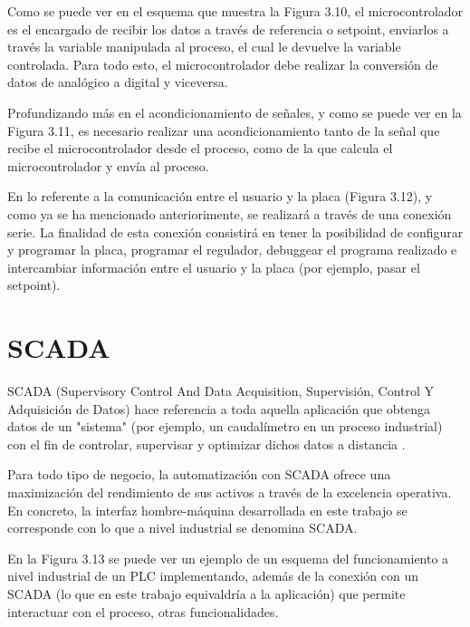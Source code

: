 Como se puede ver en el esquema que muestra la Figura 3.10, el microcontrolador es el encargado de recibir los datos a través de referencia o setpoint, enviarlos a través la variable manipulada al proceso, el cual le devuelve la variable controlada. Para todo esto, el microcontrolador debe realizar la conversión de datos de analógico a digital y viceversa. 


Profundizando más en el acondicionamiento de señales, y como se puede ver en la Figura 3.11, es necesario realizar una acondicionamiento tanto de la señal que recibe el microcontrolador desde el proceso, como de la que calcula el microcontrolador y envía al proceso.


En lo referente a la comunicación entre el usuario y la placa (Figura 3.12), y como ya se ha mencionado anteriorimente, se realizará a través de una conexión serie. La finalidad de esta conexión consistirá en tener la posibilidad de configurar y programar la placa, programar el regulador, debuggear el programa realizado e intercambiar información entre el usuario y la placa (por ejemplo, pasar el setpoint).



\section{SCADA}

SCADA (Supervisory Control And Data Acquisition, Supervisión, Control Y Adquisición de Datos) hace referencia a toda aquella aplicación que obtenga datos de un "sistema" (por ejemplo, un caudalímetro en un proceso industrial) con el fin de controlar, supervisar y optimizar dichos datos a distancia \cite{web:09scada}.

Para todo tipo de negocio, la automatización con SCADA ofrece una maximización del rendimiento de sus activos a través de la excelencia operativa. En concreto, la interfaz hombre-máquina desarrollada en este trabajo se corresponde con lo que a nivel industrial se denomina SCADA. 

En la Figura 3.13 se puede ver un ejemplo de un esquema del funcionamiento a nivel industrial de un PLC implementando, además de la conexión con un SCADA (lo que en este trabajo equivaldría a la aplicación) que permite interactuar con el proceso, otras funcionalidades.

